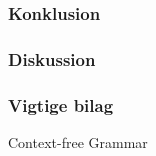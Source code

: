 \subsubsection*{Konklusion}

\subsubsection*{Diskussion}

\subsubsection*{Vigtige bilag}
\begin{itemize_small}
    \item Context-free Grammar
\end{itemize_small}

